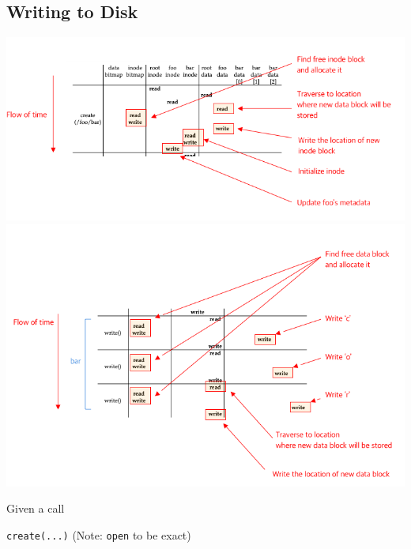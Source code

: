 \documentclass[12pt]{article}
\begin{document}
\subsection{Writing to Disk}

\begin{center}
\includegraphics[width=\linewidth]{../images/midterm_4_solution_30.png}
\includegraphics[width=\linewidth]{../images/midterm_4_solution_31.png}
\end{center}

\bigskip

Given a call

\bigskip

\texttt{create(...)} (Note: \texttt{open} to be exact)

\bigskip
\end{document}
